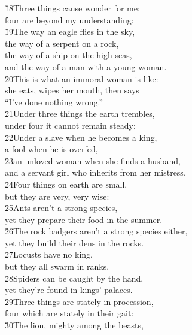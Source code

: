 \begin{poetry}
\poeml \v{18}Three things cause wonder for me; \\
\poemll    four are beyond my understanding: \\
\poeml \v{19}The way an eagle flies in the sky, \\
\poemll    the way of a serpent on a rock, \\
\poeml the way of a ship on the high seas, \\
\poemll    and the way of a man with a young woman. \\
\poeml \v{20}This is what an immoral woman is like: \\
\poemll    she eats, wipes her mouth, then says \\
\poemlll       ``I've done nothing wrong.'' \\
\poeml \v{21}Under three things the earth trembles, \\
\poemll    under four it cannot remain steady: \\
\poeml \v{22}Under a slave when he becomes a king, \\
\poemll    a fool when he is overfed, \\
\poeml \v{23}an unloved woman when she finds a husband, \\
\poemll    and a servant girl who inherits from her mistress. \\
\poeml \v{24}Four things on earth are small, \\
\poemll    but they are very, very wise: \\
\poeml \v{25}Ants aren't a strong species, \\
\poemll    yet they prepare their food in the summer. \\
\poeml \v{26}The rock badgers aren't a strong species either, \\
\poemll    yet they build their dens in the rocks. \\
\poeml \v{27}Locusts have no king, \\
\poemll    but they all swarm in ranks. \\
\poeml \v{28}Spiders can be caught by the hand, \\
\poemll    yet they're found in kings' palaces. \\
\poeml \v{29}Three things are stately in procession, \\
\poemll    four which are stately in their gait: \\
\poeml \v{30}The lion, mighty among the beasts, \\

\end{poetry}
